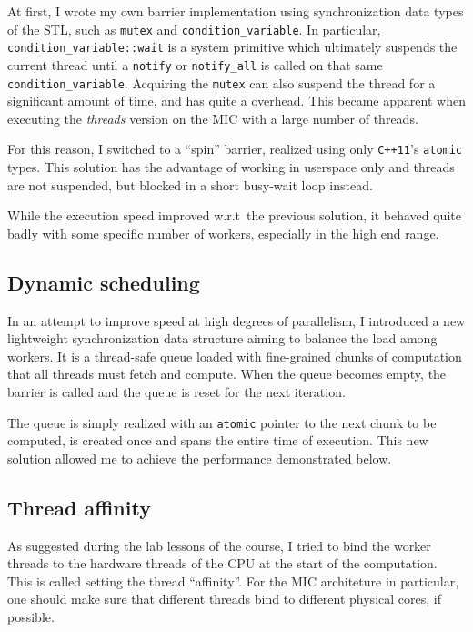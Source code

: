 \documentclass[a4paper,11pt]{article}
\newcommand{\code}[1]{\texttt{#1}}
\def\+{\discretionary{}{}{}}
\begin{document}
At first, I wrote my own barrier implementation using synchronization data types of the STL, such as \code{mutex} and \code{condition\_variable}. In particular, \code{condition\_variable::\+wait} is a system primitive which ultimately suspends the current thread until a \code{notify} or \code{notify\_all} is called on that same \code{condition\_variable}. Acquiring the \code{mutex} can also suspend the thread for a significant amount of time, and has quite a overhead. This became apparent when executing the \emph{threads} version on the MIC with a large number of threads.

For this reason, I switched to a ``spin'' barrier, realized using only \code{C++11}'s \code{atomic} types. This solution has the advantage of working in userspace only and threads are not suspended, but blocked in a short busy-wait loop instead.

While the execution speed improved w.r.t\ the previous solution, it behaved quite badly with some specific number of workers, especially in the high end range.

\subsection{Dynamic scheduling}

In an attempt to improve speed at high degrees of parallelism, I introduced a new light\-weight synchronization data structure aiming to balance the load among workers. It is a thread-safe queue loaded with fine-grained chunks of computation that all threads must fetch and compute. When the queue becomes empty, the barrier is called and the queue is reset for the next iteration.

The queue is simply realized with an \code{atomic} pointer to the next chunk to be computed, is created once and spans the entire time of execution. This new solution allowed me to achieve the performance demonstrated below.

\subsection{Thread affinity}

As suggested during the lab lessons of the course, I tried to bind the worker threads to the hardware threads of the CPU at the start of the computation. This is called setting the thread ``affinity''. For the MIC architeture in particular, one should make sure that different threads bind to different physical cores, if possible.
\end{document}
